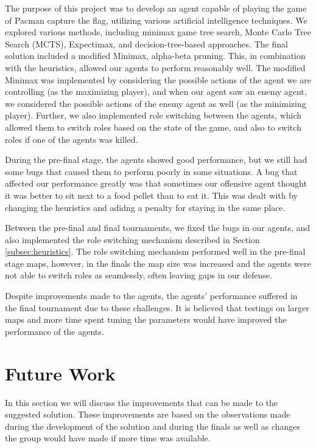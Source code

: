 \documentclass[a4paper,12pt]{article}
\begin{document}
The purpose of this project was to develop an agent capable of playing the game of Pacman capture the flag, utilizing various artificial intelligence techniques. 
We explored various methods, including minimax game tree search, Monte Carlo Tree Search (MCTS), Expectimax, and decision-tree-based approaches. 
The final solution included a modified Minimax, alpha-beta pruning. This, in combination with the heuristics, allowed our agents to perform reasonably well.
The modified Minimax was implemented by considering the possible actions of the agent we are controlling (as the maximizing player), and when our agent saw an enemy agent, we considered the possible actions of the enemy agent as well (as the minimizing player).
Further, we also implemented role switching between the agents, which allowed them to switch roles based on the state of the game, and also to switch roles if one of the agents was killed.

During the pre-final stage, the agents showed good performance, but we still had some bugs that caused them to perform poorly in some situations. 
A bug that affected our performance greatly was that sometimes our offensive agent thought it was better to sit next to a food pellet than to eat it.
This was dealt with by changing the heuristics and adidng a penalty for staying in the same place.

Between the pre-final and final tournaments, we fixed the bugs in our agents, and also implemented the role switching mechanism described in Section \ref{subsec:heuristics}.
The role switching mechanism performed well in the pre-final stage maps, however, in the finals the map size was increased and the agents were not able to switch roles as seamlessly, often leaving gaps in our defense.

Despite improvements made to the agents, the agents' performance suffered in the final tournament due to these challenges. It is believed that testings on larger maps and more time spent tuning the parameters would have improved the performance of the agents.

















\section{Future Work}
\label{subsec:Future work}
In this section we will discuss the improvements that can be made to the suggested solution. 
These improvements are based on the observations made during the development of the solution and during the finals as well as changes the group would have made if more time was available.
\end{document}
